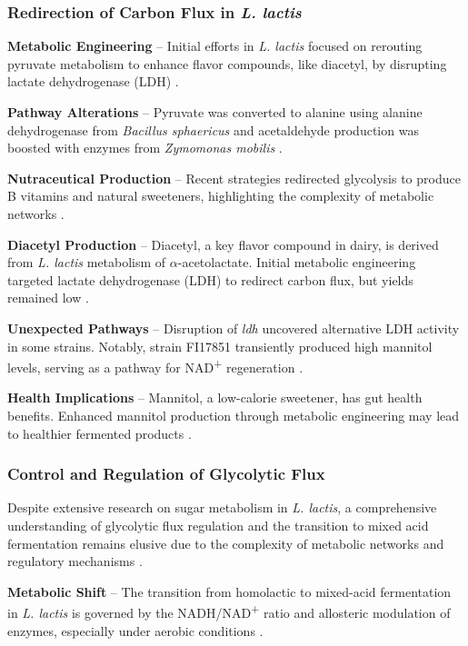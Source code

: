 \subsubsection{Redirection of Carbon Flux in \textit{L. lactis}}
\textbf{Metabolic Engineering} – Initial efforts in \textit{L. lactis} focused on rerouting pyruvate metabolism to enhance flavor compounds, like diacetyl, by disrupting lactate dehydrogenase (LDH) \cite*{L3-SugarMet}.

\textbf{Pathway Alterations} – Pyruvate was converted to alanine using alanine dehydrogenase from \textit{Bacillus sphaericus} and acetaldehyde production was boosted with enzymes from \textit{Zymomonas mobilis} \cite*{L3-SugarMet}.

\textbf{Nutraceutical Production} – Recent strategies redirected glycolysis to produce B vitamins and natural sweeteners, highlighting the complexity of metabolic networks \cite*{L3-SugarMet}.


\textbf{Diacetyl Production} – Diacetyl, a key flavor compound in dairy, is derived from \textit{L. lactis} metabolism of $\alpha$-acetolactate. Initial metabolic engineering targeted lactate dehydrogenase (LDH) to redirect carbon flux, but yields remained low \cite*{L3-SugarMet}.

\textbf{Unexpected Pathways} – Disruption of \textit{ldh} uncovered alternative LDH activity in some strains. Notably, strain FI17851 transiently produced high mannitol levels, serving as a pathway for NAD\textsuperscript{+} regeneration \cite*{L3-SugarMet}.

\textbf{Health Implications} – Mannitol, a low-calorie sweetener, has gut health benefits. Enhanced mannitol production through metabolic engineering may lead to healthier fermented products \cite*{L3-SugarMet}.

\subsubsection{Control and Regulation of Glycolytic Flux}
Despite extensive research on sugar metabolism in \textit{L. lactis}, a comprehensive understanding of glycolytic flux regulation and the transition to mixed acid fermentation remains elusive due to the complexity of metabolic networks and regulatory mechanisms \cite*{L3-SugarMet}.

\textbf{Metabolic Shift} – The transition from homolactic to mixed-acid fermentation in \textit{L. lactis} is governed by the NADH/NAD\textsuperscript{+} ratio and allosteric modulation of enzymes, especially under aerobic conditions \cite*{L3-SugarMet}.


